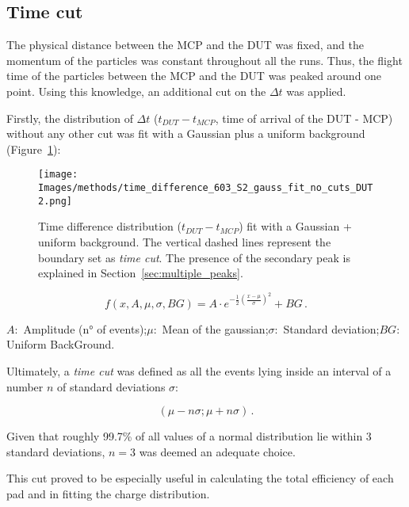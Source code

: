 \subsection{Time cut}\label{subsec:time_cut}

The physical distance between the MCP and the DUT was fixed, and the momentum of the particles was constant throughout all the runs. Thus, the flight time of the particles between the MCP and the DUT was peaked around one point. Using this knowledge, an additional cut on the \(\Delta t\) was applied.

Firstly, the distribution of \(\Delta t\) (\(t_{DUT}-t_{MCP}\), time of arrival of the DUT - MCP) without any other cut was fit with a Gaussian plus a uniform background (Figure~\ref{fig:time_cut_gauss+bg_fit}):

\begin{figure}[h!tbp]
    \centering
    \texttt{[image: Images/methods/time\_difference\_603\_S2\_gauss\_fit\_no\_cuts\_DUT2.png]}
    \captionsetup{width=\captionwidth}
    \caption{Time difference distribution (\(t_{DUT}-t_{MCP}\)) fit with a Gaussian + uniform background. The vertical dashed lines represent the boundary set as \textit{time cut}. The presence of the secondary peak is explained in Section~\ref{sec:multiple_peaks}.}
    \label{fig:time_cut_gauss+bg_fit}
\end{figure}

\begin{equation*}
    f(x,A,\mu,\sigma,BG) = A \cdot e^{-\frac{1}{2}\left(\frac{x-\mu}{\sigma} \right)^2} + BG  \, .
\end{equation*}

\(A:\) Amplitude (n° of events);\quad \(\mu:\) Mean of the gaussian;\quad \(\sigma:\) Standard deviation;\quad \(BG:\) Uniform BackGround.

Ultimately, a \textit{time cut} was defined as all the events lying inside an interval of a number \(n\) of standard deviations \(\sigma\):

\begin{equation}
    (\mu-n\sigma;\mu+n\sigma) \, .
\end{equation}

Given that roughly 99.7\% of all values of a normal distribution lie within 3 standard deviations, \(n=3\) was deemed an adequate choice.

This cut proved to be especially useful in calculating the total efficiency of each pad and in fitting the charge distribution.

